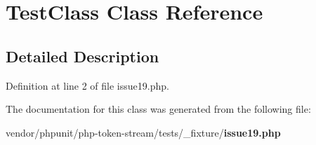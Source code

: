 \section{Test\+Class Class Reference}
\label{class_test_class}


\subsection{Detailed Description}


Definition at line 2 of file issue19.\+php.



The documentation for this class was generated from the following file\+:\begin{DoxyCompactItemize}
\item 
vendor/phpunit/php-\/token-\/stream/tests/\+\_\+fixture/{\bf issue19.\+php}\end{DoxyCompactItemize}
